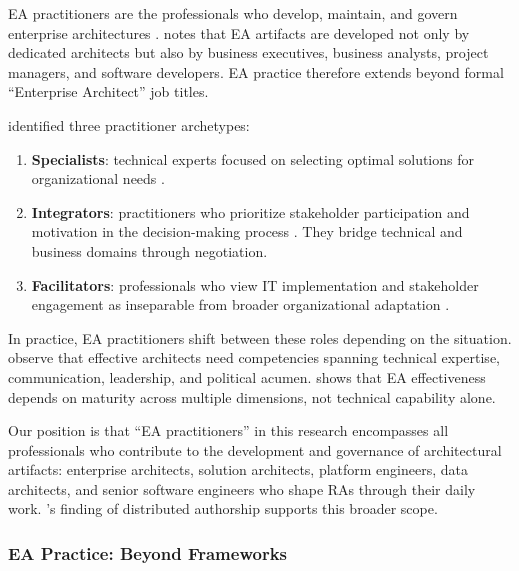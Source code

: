 EA practitioners are the professionals who develop, maintain, and govern
enterprise architectures
\parencite{kotusev_enterprise_2018, the_open_group_togaf_2022}.
\textcite{kotusev_enterprise_2018} notes that EA artifacts are developed not
only by dedicated architects but also by business executives, business analysts,
project managers, and software developers. EA practice therefore extends beyond
formal ``Enterprise Architect'' job titles.

\textcite{saint-louis_investigation_2019} identified three practitioner
archetypes:

\begin{enumerate}
      \item \textbf{Specialists}: technical experts focused on selecting optimal
            solutions for organizational needs
            \parencite{saint-louis_investigation_2019}.
      \item \textbf{Integrators}: practitioners who prioritize stakeholder
            participation and motivation in the decision-making process
            \parencite{saint-louis_investigation_2019}. They bridge technical and
            business domains through negotiation.
      \item \textbf{Facilitators}: professionals who view IT implementation and
            stakeholder engagement as inseparable from broader organizational
            adaptation \parencite{saint-louis_investigation_2019}.
\end{enumerate}

In practice, EA practitioners shift between these roles depending on the
situation. \textcite{land_enterprise_2009} observe that effective architects
need competencies spanning technical expertise, communication, leadership, and
political acumen. \textcite{van_steenbergen_maturity_2011} shows that EA
effectiveness depends on maturity across multiple dimensions, not technical
capability alone.

Our position is that ``EA practitioners'' in this research encompasses all
professionals who contribute to the development and governance of architectural
artifacts: enterprise architects, solution architects, platform engineers, data
architects, and senior software engineers who shape RAs through their daily
work. \textcite{kotusev_enterprise_2018}'s finding of distributed authorship
supports this broader scope.

\subsubsection{EA Practice: Beyond Frameworks}\label{subsubsec:ea-practice-frameworks}

